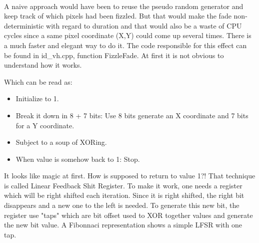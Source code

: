\begin{minipage}{\textwidth}
\centering
   \\
  \vspace*{0.5cm}
   \\
\end{minipage}


\begin{minipage}{\textwidth}
\centering
   \\
  \vspace*{0.5cm}
    \\
\end{minipage}

\begin{minipage}{\textwidth}
\centering
  \\
\vspace*{0.5cm}
  \\
\end{minipage}

A naive approach would have been to reuse the pseudo random generator  and keep track of which pixels had been fizzled. But that would make the fade non-deterministic with regard to duration and that would also be a waste of CPU cycles since a same pixel coordinate (X,Y) could come up several times. There is a much faster and elegant way to do it. The code responsible for this effect can be found in id\_vh.cpp, function FizzleFade. At first it is not obvious to understand how it works.\\
\par
\begin{minipage}{\textwidth}

\end{minipage}
\par
Which can be read as:\\
\begin{itemize}
\item Initialize  to 1.
\item Break it down in 8 + 7 bits: Use 8 bits generate an X coordinate and 7 bits for a Y coordinate.
\item Subject  to a soup of XORing.
\item When  value is somehow back to 1: Stop.
\end{itemize}        
It looks like magic at first. How is  supposed to return to value 1?! That technique is called Linear Feedback Shit Register. To make it work, one needs a register which will be right shifted each iteration. Since it is right shifted, the right bit disappears and a new one to the left is needed. To generate this new bit, the register use "taps" which are bit offset used to XOR together values and generate the new bit value. A Fibonnaci representation shows a simple LFSR with one tap.\\
\par

